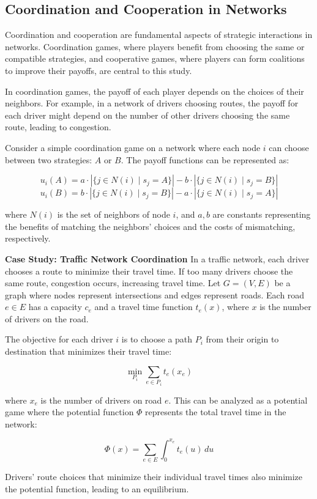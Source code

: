 \documentclass[12pt]{book} %
\begin{document}
\subsection{Coordination and Cooperation in Networks}
Coordination and cooperation are fundamental aspects of strategic interactions in networks. Coordination games, where players benefit from choosing the same or compatible strategies, and cooperative games, where players can form coalitions to improve their payoffs, are central to this study.

In coordination games, the payoff of each player depends on the choices of their neighbors. For example, in a network of drivers choosing routes, the payoff for each driver might depend on the number of other drivers choosing the same route, leading to congestion.

Consider a simple coordination game on a network where each node $i$ can choose between two strategies: $A$ or $B$. The payoff functions can be represented as:

\[
u_i(A) = a \cdot \left|\{j \in N(i) \mid s_j = A\}\right| - b \cdot \left|\{j \in N(i) \mid s_j = B\}\right|
\]
\[
u_i(B) = b \cdot \left|\{j \in N(i) \mid s_j = B\}\right| - a \cdot \left|\{j \in N(i) \mid s_j = A\}\right|
\]

where $N(i)$ is the set of neighbors of node $i$, and $a, b$ are constants representing the benefits of matching the neighbors' choices and the costs of mismatching, respectively.

\textbf{Case Study: Traffic Network Coordination}
In a traffic network, each driver chooses a route to minimize their travel time. If too many drivers choose the same route, congestion occurs, increasing travel time. Let $G = (V, E)$ be a graph where nodes represent intersections and edges represent roads. Each road $e \in E$ has a capacity $c_e$ and a travel time function $t_e(x)$, where $x$ is the number of drivers on the road.

The objective for each driver $i$ is to choose a path $P_i$ from their origin to destination that minimizes their travel time:

\[
\min_{P_i} \sum_{e \in P_i} t_e(x_e)
\]

where $x_e$ is the number of drivers on road $e$. This can be analyzed as a potential game where the potential function $\Phi$ represents the total travel time in the network:

\[
\Phi(x) = \sum_{e \in E} \int_0^{x_e} t_e(u) \, du
\]

Drivers' route choices that minimize their individual travel times also minimize the potential function, leading to an equilibrium.
\end{document}
